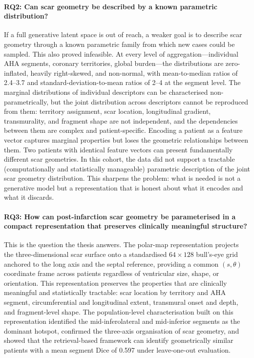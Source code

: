\paragraph{RQ2: Can scar geometry be described by a known parametric distribution?}

If a full generative latent space is out of reach, a weaker goal is to describe scar geometry
through a known parametric family from which new cases could be sampled. This also
proved infeasible. At every level of aggregation---individual AHA segments, coronary
territories, global burden---the distributions are zero-inflated, heavily right-skewed, and
non-normal, with mean-to-median ratios of 2.4--3.7 and standard-deviation-to-mean ratios of
2--4 at the segment level. The marginal distributions of individual descriptors can be
characterised non-parametrically, but the joint distribution across descriptors cannot be
reproduced from them: territory assignment, scar location, longitudinal gradient,
transmurality, and fragment shape are not independent, and the dependencies between them
are complex and patient-specific. Encoding a patient as a feature vector captures marginal
properties but loses the geometric relationships between them. Two patients with identical
feature vectors can present fundamentally different scar geometries. In this cohort, the data did not support a tractable (computationally and statistically manageable)
parametric description of the joint scar geometry distribution. This sharpens the problem: what is needed is not a generative
model but a representation that is honest about what it encodes and what it discards.

\paragraph{RQ3: How can post-infarction scar geometry be parameterised in a compact representation that preserves clinically meaningful structure?}

This is the question the thesis answers. The polar-map representation projects the
three-dimensional scar surface onto a standardised $64 \times 128$ bull's-eye grid anchored
to the long axis and the septal reference, providing a common $(s, \theta)$ coordinate frame
across patients regardless of ventricular size, shape, or orientation. This representation
preserves the properties that are clinically meaningful and statistically tractable: scar location
by territory and AHA segment, circumferential and longitudinal extent, transmural onset and
depth, and fragment-level shape. The population-level characterisation built on this
representation identified the mid-inferolateral and mid-inferior segments as the dominant
hotspot, confirmed the three-axis organisation of scar geometry, and showed that the
retrieval-based framework can identify geometrically similar patients with a mean segment
Dice of 0.597 under leave-one-out evaluation.

